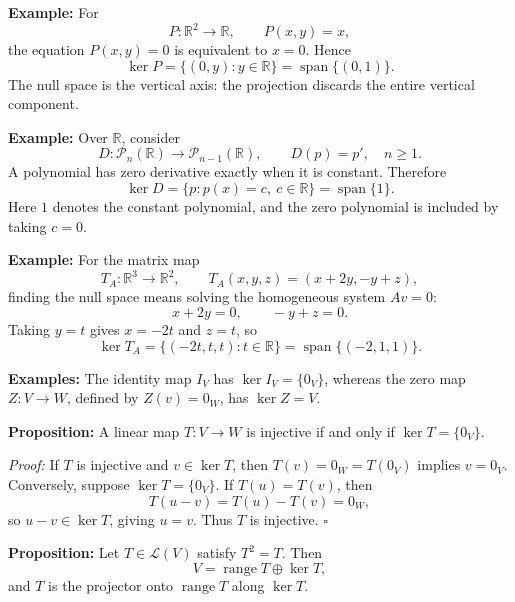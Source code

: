 \documentclass[a4paper,11pt,abstract=true]{scrartcl}
\theoremstyle{dotlessP}
\theoremstyle{dotlessS}
\theoremstyle{remark}
\theoremstyle{definition}
\begin{document}
\begin{example_box}
\textbf{Example:} For
\[
P:\mathbb{R}^2\longrightarrow\mathbb{R},\qquad P(x,y)=x,
\]
the equation $P(x,y)=0$ is equivalent to $x=0$. Hence
\[
\ker P=\{(0,y):y\in\mathbb{R}\}
=\operatorname{span}\{(0,1)\}.
\]
The null space is the vertical axis: the projection discards the entire
vertical component.
\end{example_box}

\begin{example_box}
\textbf{Example:} Over $\mathbb{R}$, consider
\[
D:\mathcal{P}_n(\mathbb{R})\longrightarrow\mathcal{P}_{n-1}(\mathbb{R}),
\qquad D(p)=p',\quad n\geq1.
\]
A polynomial has zero derivative exactly when it is constant. Therefore
\[
\ker D=\{p:p(x)=c,\ c\in\mathbb{R}\}
=\operatorname{span}\{1\}.
\]
Here $1$ denotes the constant polynomial, and the zero polynomial is
included by taking $c=0$.
\end{example_box}

\begin{example_box}
\textbf{Example:} For the matrix map
\[
T_A:\mathbb{R}^3\longrightarrow\mathbb{R}^2,
\qquad T_A(x,y,z)=(x+2y,-y+z),
\]
finding the null space means solving the homogeneous system $Av=0$:
\[
x+2y=0,\qquad -y+z=0.
\]
Taking $y=t$ gives $x=-2t$ and $z=t$, so
\[
\ker T_A=\{(-2t,t,t):t\in\mathbb{R}\}
=\operatorname{span}\{(-2,1,1)\}.
\]
\end{example_box}

\begin{example_box}
\textbf{Examples:} The identity map $I_V$ has
$\ker I_V=\{0_V\}$, whereas the zero map $Z:V\longrightarrow W$,
defined by $Z(v)=0_W$, has $\ker Z=V$.
\end{example_box}

\begin{problem_box}
\textbf{Proposition:} A linear map
$T:V\longrightarrow W$ is injective if and only if $\ker T=\{0_V\}$.

\end{problem_box}

\begin{claim_box}
\textit{Proof:} If $T$ is injective and $v\in\ker T$, then
$T(v)=0_W=T(0_V)$ implies $v=0_V$. Conversely, suppose
$\ker T=\{0_V\}$. If $T(u)=T(v)$, then
\[
T(u-v)=T(u)-T(v)=0_W,
\]
so $u-v\in\ker T$, giving $u=v$. Thus $T$ is injective.
\hfill$\square$
\end{claim_box}

\begin{problem_box}
\textbf{Proposition:} Let $T\in\mathcal{L}(V)$ satisfy $T^2=T$. Then
\[
V=\operatorname{range}T\oplus\ker T,
\]
and $T$ is the projector onto $\operatorname{range}T$ along $\ker T$.
\end{problem_box}
\end{document}

